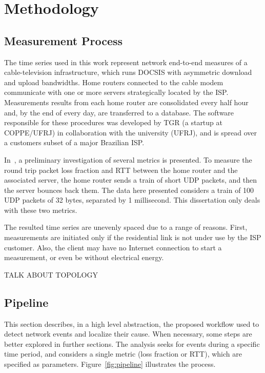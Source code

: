 \chapter{Methodology}
\label{chap:methodology}

\section{Measurement Process}

The time series used in this work represent network end-to-end measures of a
cable-television infrastructure, which runs DOCSIS with asymmetric download and
upload bandwidths. Home routers connected to the cable modem communicate with
one or more servers strategically located by the ISP\@. Measurements results
from
each home router are consolidated every half hour and, by the end of every day,
are transferred to a database. The software responsible for these procedures was
developed by TGR (a startup at COPPE/UFRJ) in collaboration with the university
(UFRJ), and is spread over a customers subset of a major Brazilian ISP\@.

In~\cite{a_preliminary_performance_measurement_study_of_residential_broadband_services_in_brazil},
a preliminary investigation of several metrics is presented. To measure the
round
trip packet loss fraction and RTT between the home router and the associated
server, the
home router sends a train of short UDP packets, and then the server bounces back
them. The data here presented considers a train of 100 UDP packets of 32 bytes,
separated by 1 millisecond. This dissertation only deals with these two
metrics.

The resulted time series are unevenly spaced due to a range of reasons. First,
measurements are initiated only if the residential link is not under use by the
ISP customer. Also, the client may have no Internet connection to start a
measurement, or even be without electrical energy.

TALK ABOUT TOPOLOGY

\section{Pipeline}

This section describes, in a high level abstraction, the proposed workflow
used to detect network events and localize their cause. When necessary, some
steps are better explored in further sections.
The analysis seeks for events during a specific time period, and considers a
single metric (loss fraction or RTT), which are specified as parameters.
Figure~\ref{fig:pipeline} illustrates the process.


